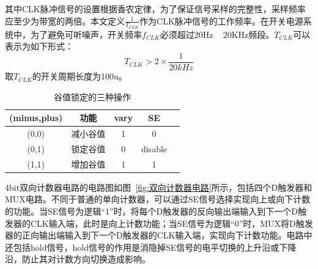 其中CLK脉冲信号的设置根据香农定律，为了保证信号采样的完整性，采样频率应至少为带宽的两倍。本文定义$\frac{1}{T_{CLK}}$作为CLK脉冲信号的工作频率。在开关电源系统中，为了避免可听噪声，开关频率$f_{CLK}$必须超过20Hz ~ 20KHz频段。$T_{CLK}$可以表示为如下形式：
\begin{equation}
    \label{eq:CLK公式}
    T_{CLK} > 2 \times \frac{1}{20kHz}
\end{equation}
取$T_{CLK}$的开关周期长度为100u。





\begin{table}[htbp]
    \caption{谷值锁定的三种操作}
    \label{tab:谷值锁定电路}
    \centering
    \belowrulesep=0pt  %
    \aboverulesep=0pt  %
        \begin{tabular}{|c|c|c|c|c|}
            \toprule
             (minus,plus) & 功能 & vary & SE \\
            \midrule
             (0,0)  & 减小谷值  & 1 &    0                   \\  \midrule
             (0,1)  & 锁定谷值  & 0 & disable                \\  \midrule
             (1,1)  & 增加谷值  & 1 &    1       \\          
            \bottomrule
        \end{tabular}
\end{table}

4bit双向计数器电路的电路图如图~\ref{fig:双向计数器电路}所示，包括四个D触发器和MUX电路。不同于普通的单向计数器，可以通过SE信号选择实现向上或向下计数的功能。当SE信号为逻辑“1”时，将每个D触发器的反向输出端输入到下一个D触发器的CLK输入端，此时是向上计数功能；当SE信号为逻辑“0”时，MUX将D触发器的正向输出端输入到下一个D触发器的CLK输入端，实现向下计数功能。电路中还包括hold信号，hold信号的作用是消隐掉SE信号的电平切换的上升沿或下降沿，防止其对计数方向切换造成影响。

